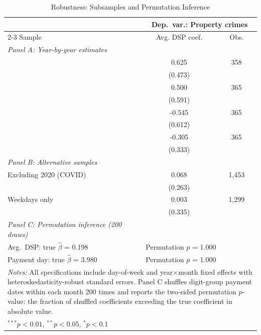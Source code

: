\begin{table}[t]
\centering
\caption{Robustness: Subsamples and Permutation Inference}
\label{tab:robust}
\begin{tabular}{lcc}
\hline\hline
 & \multicolumn{2}{c}{Dep.~var.: Property crimes} \\
\cmidrule(lr){2-3}
Sample & Avg. DSP coef. & Obs. \\
\hline
\textit{Panel A: Year-by-year estimates} \\[3pt]
\quad 2019 & 0.625 & 358 \\
 & (0.473) & \\
\quad 2021 & 0.500 & 365 \\
 & (0.591) & \\
\quad 2022 & -0.545 & 365 \\
 & (0.612) & \\
\quad 2023 & -0.305 & 365 \\
 & (0.333) & \\
[6pt]
\textit{Panel B: Alternative samples} \\[3pt]
\quad Excluding 2020 (COVID) & 0.068 & 1,453 \\
 & (0.263) & \\
\quad Weekdays only & 0.003 & 1,299 \\
 & (0.335) & \\
[6pt]
\textit{Panel C: Permutation inference (200 draws)} \\[3pt]
\quad Avg.~DSP: true $\hat{\beta}$ = 0.198 & \multicolumn{2}{l}{Permutation $p$ = 1.000} \\
\quad Payment day: true $\hat{\beta}$ = 3.980 & \multicolumn{2}{l}{Permutation $p$ = 1.000} \\
\hline
\multicolumn{3}{p{0.85\textwidth}}{\footnotesize \textit{Notes:} All specifications include day-of-week and year$\times$month fixed effects with heteroskedasticity-robust standard errors. Panel C shuffles digit-group payment dates within each month 200 times and reports the two-sided permutation $p$-value: the fraction of shuffled coefficients exceeding the true coefficient in absolute value.} \\
\multicolumn{3}{l}{\footnotesize $^{***}p<0.01$, $^{**}p<0.05$, $^{*}p<0.1$} \\
\end{tabular}
\end{table}
